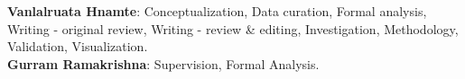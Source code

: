 \documentclass[12pt,a4paper]{article}
\begin{document}
\begin{titlepage}
\noindent \textbf{Vanlalruata Hnamte}: Conceptualization, Data curation, Formal analysis, Writing - original review, Writing - review \& editing, Investigation,  Methodology,  Validation, Visualization. \\

\noindent \textbf{Gurram Ramakrishna}: Supervision, Formal Analysis.













\end{titlepage}
\end{document}
